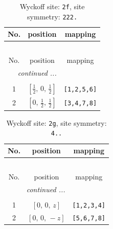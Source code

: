 \documentclass[fleqn,8pt]{jsarticle}
\begin{document}
\renewcommand{\arraystretch}{1.2}
\begin{longtable}{ccc}
\caption{Wyckoff site: {\tt 2f}, site symmetry: {\tt 222.}}
 \\
 \hline \hline
No. & position & mapping \\ \hline \endfirsthead

\multicolumn{2}{l}{\tablename\ \thetable{}} \\
 \hline \hline
No. & position & mapping \\ \hline \endhead

 \hline \hline
\multicolumn{2}{r}{\footnotesize\it continued ...} \\ \endfoot

 \hline \hline
\multicolumn{2}{r}{} \\ \endlastfoot

1 & $\left[ \frac{1}{2},\, 0,\, \frac{1}{2} \right]$ & {\tt [1,2,5,6]} \\ \hline
2 & $\left[ 0,\, \frac{1}{2},\, \frac{1}{2} \right]$ & {\tt [3,4,7,8]} \\
\end{longtable}
\renewcommand{\arraystretch}{1.2}
\begin{longtable}{ccc}
\caption{Wyckoff site: {\tt 2g}, site symmetry: {\tt 4..}}
 \\
 \hline \hline
No. & position & mapping \\ \hline \endfirsthead

\multicolumn{2}{l}{\tablename\ \thetable{}} \\
 \hline \hline
No. & position & mapping \\ \hline \endhead

 \hline \hline
\multicolumn{2}{r}{\footnotesize\it continued ...} \\ \endfoot

 \hline \hline
\multicolumn{2}{r}{} \\ \endlastfoot

1 & $\left[ 0,\, 0,\, z \right]$ & {\tt [1,2,3,4]} \\ \hline
2 & $\left[ 0,\, 0,\, - z \right]$ & {\tt [5,6,7,8]} \\
\end{longtable}
\renewcommand{\arraystretch}{1.2}
\end{document}
